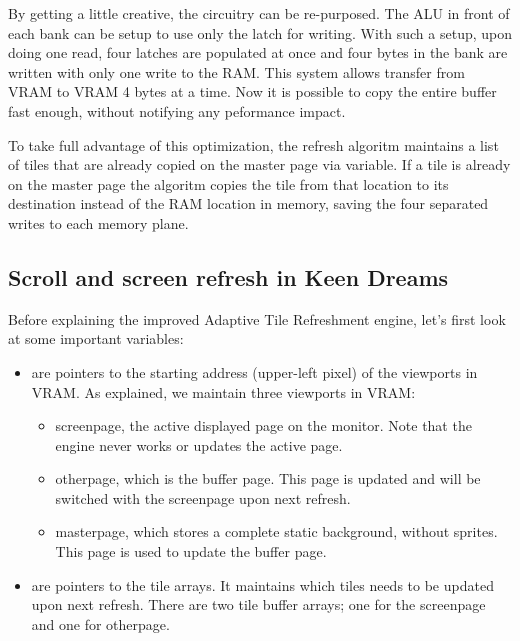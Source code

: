 \documentclass[book.tex]{subfiles}
\begin{document}
\par
By getting a little creative, the circuitry can be re-purposed. The ALU in front of each bank can be setup to use only the latch for writing. With such a setup, upon doing one read, four latches are populated at once and four bytes in the bank are written with only one write to the RAM. This system allows transfer from VRAM to VRAM 4 bytes at a time. Now it is possible to copy the entire buffer fast enough, without notifying any peformance impact.\\
\par
\begin{minipage}{\textwidth}
  
  \end{minipage}
  \label{ega_latch_copy}
  \par

To take full advantage of this optimization, the refresh algoritm maintains a list of tiles that are already copied on the master page via  variable. If a tile is already on the master page the algoritm copies the tile from that location to its destination instead of the RAM location in memory, saving the four separated writes to each memory plane.\\




\subsection{Scroll and screen refresh in Keen Dreams} \label{section:scroll_refresh_dreams}

Before explaining the improved Adaptive Tile Refreshment engine, let's first look at some important variables:
\begin{itemize}
  \item {} are pointers to the starting address (upper-left pixel) of the viewports in VRAM. As explained, we maintain three viewports in VRAM:
  \begin{itemize}
    \item screenpage, the active displayed page on the monitor. Note that the engine never works or updates the active page.
    \item otherpage, which is the buffer page. This page is updated and will be switched with the screenpage upon next refresh.
    \item masterpage, which stores a complete static background, without sprites. This page is used to update the buffer page.
  \end{itemize}
  \item {} are pointers to the tile arrays. It maintains which tiles needs to be updated upon next refresh. There are two tile buffer arrays; one for the screenpage and one for otherpage. 
\end{itemize}
\end{document}
